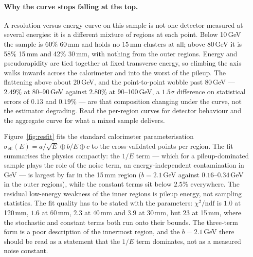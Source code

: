 \documentclass[11pt,a4paper]{article}
\newcommand{\seff}{\ensuremath{\sigma_{\mathrm{eff}}}}
\begin{document}
\paragraph{Why the curve stops falling at the top.} A resolution-versus-energy
curve on this sample is not one detector measured at several energies: it is a
different mixture of regions at each point. Below 10\,GeV the sample is 60\%
60\,mm and holds no 15\,mm clusters at all; above 80\,GeV it is 58\% 15\,mm and
42\% 30\,mm, with nothing from the outer regions. Energy and pseudorapidity are
tied together at fixed transverse energy, so climbing the axis walks inwards
across the calorimeter and into the worst of the pileup. The flattening above
about 20\,GeV, and the point-to-point wobble past 80\,GeV --- $2.49\%$ at
80--90\,GeV against $2.80\%$ at 90--100\,GeV, a $1.5\sigma$ difference on
statistical errors of $0.13$ and $0.19\%$ --- are that composition changing
under the curve, not the estimator degrading. Read the per-region curves for
detector behaviour and the aggregate curve for what a mixed sample delivers.

Figure~\ref{fig:resfit} fits the standard calorimeter parameterisation
$\seff(E) = a/\sqrt{E} \oplus b/E \oplus c$ to the cross-validated points
per region. The fit summarises the physics compactly: the $1/E$ term ---
which for a pileup-dominated sample plays the role of the noise term, an
energy-independent contamination in GeV --- is largest by far in the 15\,mm
region ($b = 2.1$\,GeV against $0.16$--$0.34$\,GeV in the outer regions),
while the constant terms sit below $2.5\%$ everywhere. The residual low-energy
weakness of the inner regions is pileup energy, not sampling statistics.
The fit quality has to be stated with the parameters: $\chi^2/\mathrm{ndf}$
is $1.0$ at 120\,mm, $1.6$ at 60\,mm, $2.3$ at 40\,mm and $3.9$ at 30\,mm,
but $23$ at 15\,mm, where the stochastic and constant terms both run onto
their bounds. The three-term form is a poor description of the innermost
region, and the $b = 2.1$\,GeV there should be read as a statement that the
$1/E$ term dominates, not as a measured noise constant.
\end{document}
